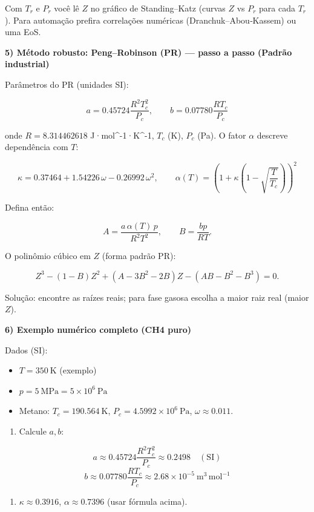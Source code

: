 \documentclass[11pt,a4paper]{article}
\begin{document}
Com $T_r$ e $P_r$ você lê $Z$ no gráfico de Standing–Katz (curvas $Z$ vs $P_r$ para cada $T_r$). Para automação prefira correlações numéricas (Dranchuk–Abou‑Kassem) ou uma EoS.

\textbf{5) Método robusto: Peng–Robinson (PR) — passo a passo (Padrão industrial)}

Parâmetros do PR (unidades SI):

$$
a = 0.45724 \frac{R^2 T_c^2}{P_c},\qquad b = 0.07780 \frac{R T_c}{P_c}
$$

onde $R=8.314462618$ J·mol^{-1}·K^{-1}, $T_c$ (K), $P_c$ (Pa). O fator $\alpha$ descreve dependência com $T$:

$$
\kappa = 0.37464 + 1.54226\,\omega - 0.26992\,\omega^2,\qquad
\alpha(T) = \left(1 + \kappa \left(1-\sqrt{\dfrac{T}{T_c}}\right)\right)^2
$$

Defina então:

$$
A = \dfrac{a\,\alpha(T)\,p}{R^2 T^2},\qquad B = \dfrac{b p}{R T}.
$$

O polinômio cúbico em $Z$ (forma padrão PR):

$$
Z^3 - (1 - B) Z^2 + (A - 3B^2 - 2B) Z - (A B - B^2 - B^3) = 0.
$$

Solução: encontre as raízes reais; para fase gasosa escolha a maior raiz real (maior $Z$).

\textbf{6) Exemplo numérico completo (CH4 puro)}

Dados (SI):
\begin{itemize}
\item $T = 350\ \mathrm{K}$ (exemplo)
\item $p = 5\ \mathrm{MPa} = 5\times10^6\ \mathrm{Pa}$
\item Metano: $T_c = 190.564\ \mathrm{K}$, $P_c = 4.5992\times10^6\ \mathrm{Pa}$, $\omega\approx0.011$.
\end{itemize}

\begin{enumerate}
\item Calcule $a,b$:
\end{enumerate}

$$
a \approx 0.45724\dfrac{R^2 T_c^2}{P_c} \approx 0.2498\quad(\mathrm{SI})
$$
$$
b \approx 0.07780\dfrac{R T_c}{P_c} \approx 2.68\times10^{-5}\ \mathrm{m^3\,mol^{-1}}
$$

\begin{enumerate}
\item $\kappa\approx 0.3916$, $\alpha\approx 0.7396$ (usar fórmula acima).
\end{enumerate}
\end{document}
